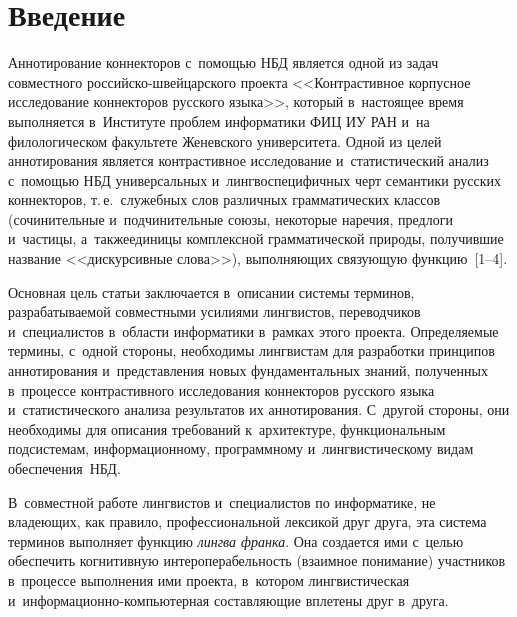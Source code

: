 

\vspace*{-5pt}




\thispagestyle{headings}

\begin{multicols}{2}

\label{st\stat}
   
\section{Введение}
    
   Аннотирование коннекторов с~помощью НБД 
является одной из задач совместного рос\-сий\-ско-швей\-цар\-ско\-го проекта 
<<Контрастивное корпусное исследование коннекторов русского языка>>, 
который в~настоящее время выполняется в~Институте проблем информатики 
ФИЦ ИУ РАН и~на филологическом факультете Женевского университета. 
Одной из целей аннотирования является контрастивное исследование 
и~статистический анализ с~помощью НБД универсальных 
и~лингвоспецифичных черт семантики русских коннекторов, т.\,е.\ служебных 
слов различных грамматических клас\-сов (сочинительные и~подчинительные 
союзы, некоторые наречия, предлоги и~частицы, а~также\linebreak единицы комплексной 
грамматической природы, получившие название <<дискурсивные  
слова>>), выполняющих связующую функцию~[1--4].

   
    Основная цель статьи заключается в~описании системы терминов, 
разрабатываемой совместными усилиями лингвистов, переводчиков 
и~специалистов в~области информатики в~рамках этого проекта. Определяемые 
термины, с~одной стороны, необходимы лингвистам для разработки принципов\linebreak 
аннотирования и~представления новых фундаментальных знаний, полученных 
в~процессе конт\-рас\-тив\-но\-го исследования коннекторов русского языка 
и~статистического анализа результатов их аннотирова\-ния. С~другой стороны, 
они необходимы для описания требований к~архитектуре, функциональным 
подсистемам, информационному, программному и~лингвистическому видам 
обеспечения~НБД. 

В~совместной работе лингвистов и~специалистов по 
информатике, не владеющих, как правило, профессиональной лексикой друг 
друга, эта система терминов выполняет функцию \textit{лингва франка}. Она 
создается ими с~целью обеспечить когнитивную интероперабельность 
(взаимное понимание) участ\-ников в~процессе выполнения ими проекта, 
в~котором лингвистическая и~ин\-фор\-ма\-ци\-он\-но-ком\-пью\-тер\-ная  
со\-став\-ля\-ющие вплетены друг в~друга. 


\end{multicols}
